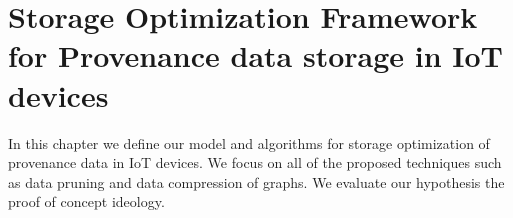 
\chapter{Storage Optimization Framework for Provenance data storage in IoT devices} \label{MostNarrowEasy}

In this chapter we define our model and algorithms for storage optimization of provenance data in IoT devices. We focus on all of the proposed techniques such as data pruning and data compression of graphs.  We evaluate our hypothesis the proof of concept ideology.

%
%



